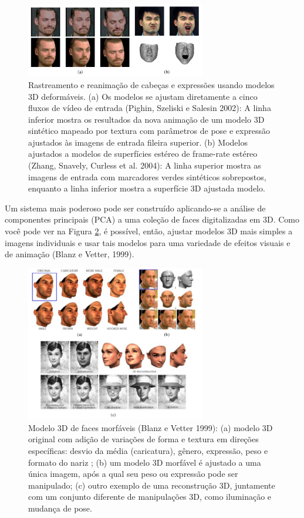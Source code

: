 \documentclass{article}
\begin{document}
\begin{figure}[!htb]
    \centering
    \includegraphics[width=0.7\textwidth]{img5.png}
    \caption{Rastreamento e reanimação de cabeças e expressões usando modelos 3D deformáveis. (a) Os modelos se ajustam diretamente a cinco fluxos de vídeo de entrada (Pighin, Szeliski e Salesin 2002): A linha inferior mostra os resultados da nova animação de um modelo 3D sintético mapeado por textura com parâmetros de pose e expressão ajustados às imagens de entrada fileira superior. (b) Modelos ajustados a modelos de superfícies estéreo de frame-rate estéreo (Zhang, Snavely, Curless et al. 2004): A linha superior mostra as imagens de entrada com marcadores verdes sintéticos sobrepostos, enquanto a linha inferior mostra a superfície 3D ajustada modelo.
}
    \label{fig:img5}
\end{figure}

Um sistema mais poderoso pode ser construído aplicando-se a análise de componentes principais (PCA) a uma coleção de faces digitalizadas em 3D. Como você pode ver na Figura \ref{fig:img6}, é possível, então, ajustar modelos 3D mais simples a imagens individuais e usar tais modelos para uma variedade de efeitos visuais e de animação (Blanz e Vetter, 1999)\cite{Blanz:1999:MMS:311535.311556}.

\begin{figure}[!htb]
    \centering
    \includegraphics[width=0.7\textwidth]{img6.png}
    \caption{Modelo 3D de faces morfáveis (Blanz e Vetter 1999)\cite{Blanz:1999:MMS:311535.311556}: (a) modelo 3D original com adição de variações de forma e textura em direções específicas: desvio da média (caricatura), gênero, expressão, peso e formato do nariz ; (b) um modelo 3D morfável é ajustado a uma única imagem, após a qual seu peso ou expressão pode ser manipulado; (c) outro exemplo de uma reconstrução 3D, juntamente com um conjunto diferente de manipulações 3D, como iluminação e mudança de pose.
}
    \label{fig:img6}
\end{figure}
\end{document}

